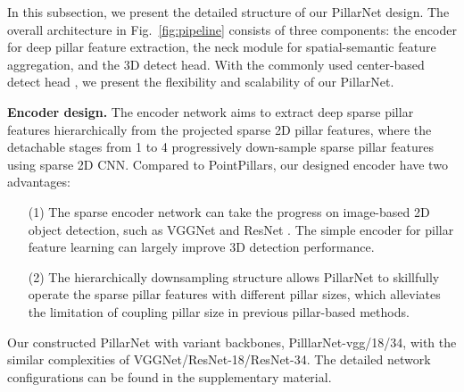 \documentclass[runningheads]{llncs}
\begin{document}
In this subsection, we present the detailed structure of our PillarNet design.
The overall architecture in Fig.~\ref{fig:pipeline} consists of three components: the encoder for deep pillar feature extraction, the neck module for spatial-semantic feature aggregation, and the 3D detect head. 
With the commonly used center-based detect head \cite{yin2021center}, we  present the flexibility and scalability of our PillarNet.

{\flushleft \bf Encoder design.} 
The encoder network aims to extract deep sparse pillar features hierarchically from the projected sparse 2D pillar features, where the detachable stages from 1 to 4 progressively down-sample sparse pillar features using sparse 2D CNN.
Compared to PointPillars\cite{lang2019pointpillars}, our designed encoder have two advantages:
\begin{itemize}\itemsep2pt
\item[(1)] The sparse encoder network can take the progress on image-based 2D object detection, such as VGGNet \cite{simonyan2014two} and ResNet \cite{he2016deep}.
The simple encoder for pillar feature learning can largely improve 3D detection performance.
\item[(2)] The hierarchically downsampling structure allows PillarNet to skillfully operate the sparse pillar features with different pillar sizes, which alleviates the limitation of coupling pillar size in previous pillar-based methods.
\end{itemize}

Our constructed PillarNet with variant backbones, PilllarNet-vgg/18/34, with the similar complexities of VGGNet/ResNet-18/ResNet-34. The detailed network configurations can be found in the supplementary material.
\end{document}
